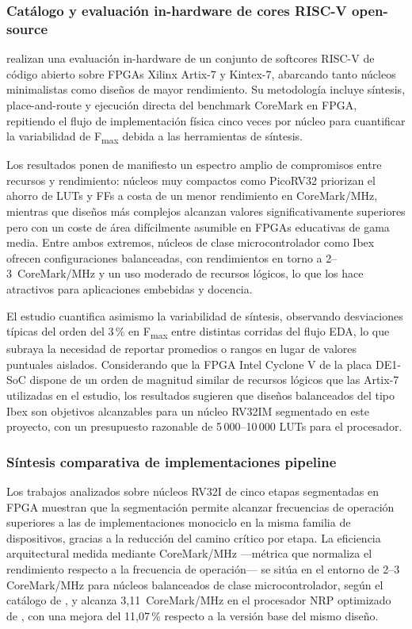 \subsubsection{Catálogo y evaluación in-hardware de cores RISC-V open-source}

\textcite{Heinz2019Catalog} realizan una evaluación in-hardware de un conjunto
de softcores RISC-V de código abierto sobre FPGAs Xilinx Artix-7 y Kintex-7,
abarcando tanto núcleos minimalistas como diseños de mayor rendimiento.
Su metodología incluye síntesis, place-and-route y ejecución directa del
benchmark CoreMark en FPGA, repitiendo el flujo de implementación física cinco
veces por núcleo para cuantificar la variabilidad de F\textsubscript{max}
debida a las herramientas de síntesis.

Los resultados ponen de manifiesto un espectro amplio de compromisos entre
recursos y rendimiento: núcleos muy compactos como PicoRV32 priorizan el ahorro
de LUTs y FFs a costa de un menor rendimiento en CoreMark/MHz, mientras que
diseños más complejos alcanzan valores significativamente superiores pero con un
coste de área difícilmente asumible en FPGAs educativas de gama media. Entre
ambos extremos, núcleos de clase microcontrolador como Ibex ofrecen
configuraciones balanceadas, con rendimientos en torno a 2--3~CoreMark/MHz y un
uso moderado de recursos lógicos, lo que los hace atractivos para aplicaciones
embebidas y docencia.

El estudio cuantifica asimismo la variabilidad de síntesis, observando
desviaciones típicas del orden del 3\,\% en F\textsubscript{max} entre distintas
corridas del flujo EDA, lo que subraya la necesidad de reportar promedios o
rangos en lugar de valores puntuales aislados. Considerando que la FPGA Intel
Cyclone V de la placa DE1-SoC dispone de un orden de magnitud similar de
recursos lógicos que las Artix-7 utilizadas en el estudio, los resultados
sugieren que diseños balanceados del tipo Ibex son objetivos alcanzables para
un núcleo RV32IM segmentado en este proyecto, con un presupuesto razonable de
5\,000--10\,000 LUTs para el procesador.
\parencite{Heinz2019Catalog,Wei2024NEORV32}


\subsubsection{Síntesis comparativa de implementaciones pipeline}

Los trabajos analizados sobre núcleos RV32I de cinco etapas segmentadas en FPGA
muestran que la segmentación permite alcanzar frecuencias de operación
superiores a las de implementaciones monociclo en la misma familia de
dispositivos, gracias a la reducción del camino crítico por
etapa.\parencite{Patterson2017Computer,Harris2021Digital} La eficiencia
arquitectural medida mediante CoreMark/MHz —métrica que normaliza el rendimiento
respecto a la frecuencia de operación— se sitúa en el entorno de 2--3
CoreMark/MHz para núcleos balanceados de clase microcontrolador, según el
catálogo de \textcite{Heinz2019Catalog}, y alcanza 3{,}11~CoreMark/MHz en el
procesador NRP optimizado de \textcite{Wei2024NEORV32}, con una mejora del
11{,}07\,\% respecto a la versión base del mismo diseño.

